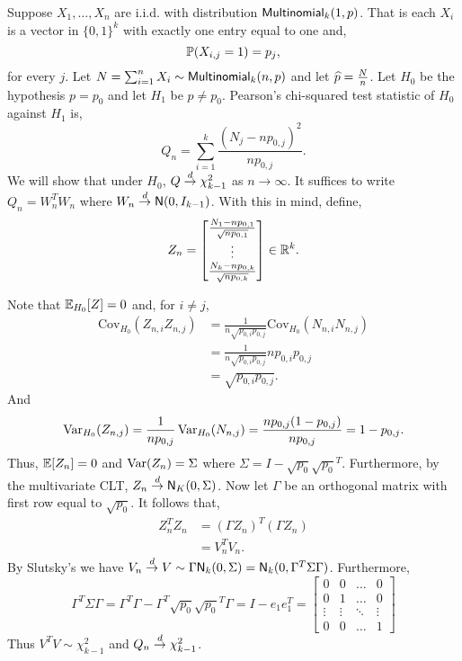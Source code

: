\begin{example}
    Suppose $X_1,\ldots,X_n$ are i.i.d. with distribution $\mathsf{Multinomial}_k(1,p)$. That is each $X_i$ is a vector in $\{0,1\}^k$ with exactly one entry equal to one and,
    \[{\mathbb{P}}(X_{i,j} = 1) = p_j,  \]
    for every $j$. Let $N=\sum_{i=1}^n X_i \sim \mathsf{Multinomial}_k(n,p)$ and let $\widehat{p} = \frac{N}{n}$. Let $H_0$ be the hypothesis $p= p_0$ and let $H_1$ be $p \neq p_0$. Pearson's chi-squared test statistic of $H_0$ against $H_1$ is,
    \[Q_n = \sum_{i=1}^k \frac{(N_j-np_{0,j})^2}{np_{0,j}}.\]
    We will show that under $H_0$, $Q \stackrel{d}{\to} \chi^2_{k-1}$ as $n \to \infty$. It suffices to write $Q_n = W_n^TW_n$ where $W_n \stackrel{d}{\to} \mathsf{N}(0,I_{k-1})$. With this in mind, define,
    \[Z_n = \begin{bmatrix}
        \frac{N_1-np_{0,1}}{\sqrt{np_{0,1}}}\\
        \vdots \\
        \frac{N_k-np_{0,k}}{\sqrt{np_{0,k}}}
    \end{bmatrix} \in {\mathbb R}^k.\]
\end{example}
Note that ${\mathbb{E}}_{H_0}[Z]=0$ and, for $i \neq j$,
\begin{align*}
    \text{Cov}_{H_0}(Z_{n,i}Z_{n,j})&= \frac{1}{n\sqrt{p_{0,i}p_{0,j}}}\text{Cov}_{H_0}(N_{n,i}N_{n,j})\\
    &= \frac{1}{n\sqrt{p_{0,i}p_{0,j}}} np_{0,i}p_{0,j}\\
    &=\sqrt{p_{0,i}p_{0,j}}.
\end{align*}
And \[\operatorname{Var}_{H_0}(Z_{n,j}) = \frac{1}{np_{0,j}}\operatorname{Var}_{H_0}(N_{n,j}) = \frac{np_{0,j}(1-p_{0,j})}{np_{0,j}} = 1-p_{0,j}.\] 
Thus, ${\mathbb{E}}[Z_n]=0$ and $\operatorname{Var}(Z_n) = \Sigma$ where $\Sigma = I - \sqrt{p_0}\sqrt{p_0}^T$. Furthermore, by the multivariate CLT, $Z_n \stackrel{d}{\to} \mathsf{N}_K(0,\Sigma)$. Now let $\Gamma$ be an orthogonal matrix with first row equal to $\sqrt{p_0}$. It follows that,
\begin{align*}
    Z_n^TZ_n &= (\Gamma Z_n)^T(\Gamma Z_n)\\
    &=V_n^TV_n.
\end{align*}
By Slutsky's we have $V_n \stackrel{d}{\to} V \sim \Gamma\mathsf{N}_k(0,\Sigma) = \mathsf{N}_k(0,\Gamma^T\Sigma \Gamma)$. Furthermore,
\[\Gamma^T\Sigma \Gamma = \Gamma^T\Gamma - \Gamma^T \sqrt{p_0} \sqrt{p_0}^T \Gamma = I - e_1e_1^T = \begin{bmatrix}
    0&0&\ldots & 0\\
    0&1&\ldots & 0\\
    \vdots&\vdots&\ddots&\vdots\\
    0&0&\ldots &1
\end{bmatrix}\]
Thus $V^TV \sim \chi^2_{k-1}$ and $Q_n \stackrel{d}{\to} \chi^2_{k-1}$.
